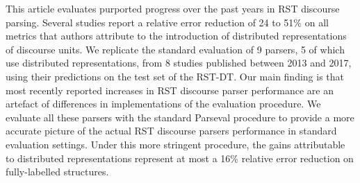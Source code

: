This article evaluates purported progress over the past years in RST discourse parsing. Several studies report a relative error reduction of 24 to 51\% on all metrics that authors attribute to the introduction of distributed representations of discourse units. We replicate the standard evaluation of 9 parsers, 5 of which use distributed representations, from 8 studies published between 2013 and 2017, using their predictions on the test set of the RST-DT. Our main finding is that most recently reported increases in RST discourse parser performance are an artefact of differences in implementations of the evaluation procedure. We evaluate all these parsers with the standard Parseval procedure to provide a more accurate picture of the actual RST discourse parsers performance in standard evaluation settings. Under this more stringent procedure, the gains attributable to distributed representations represent at most a 16\% relative error reduction on fully-labelled structures.
